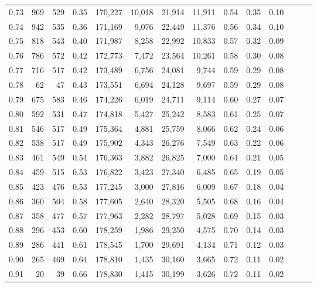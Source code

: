 \begin{tabular}{rrrrrrrrrrrrrr}
0.73 &    969 &  529 &  0.35 &  170,227 &   10,018 &  21,914 &  11,911 &  0.54 &  0.35 &      0.10 \\
0.74 &    942 &  535 &  0.36 &  171,169 &    9,076 &  22,449 &  11,376 &  0.56 &  0.34 &      0.10 \\
0.75 &    818 &  543 &  0.40 &  171,987 &    8,258 &  22,992 &  10,833 &  0.57 &  0.32 &      0.09 \\
0.76 &    786 &  572 &  0.42 &  172,773 &    7,472 &  23,564 &  10,261 &  0.58 &  0.30 &      0.08 \\
0.77 &    716 &  517 &  0.42 &  173,489 &    6,756 &  24,081 &   9,744 &  0.59 &  0.29 &      0.08 \\
0.78 &     62 &   47 &  0.43 &  173,551 &    6,694 &  24,128 &   9,697 &  0.59 &  0.29 &      0.08 \\
0.79 &    675 &  583 &  0.46 &  174,226 &    6,019 &  24,711 &   9,114 &  0.60 &  0.27 &      0.07 \\
0.80 &    592 &  531 &  0.47 &  174,818 &    5,427 &  25,242 &   8,583 &  0.61 &  0.25 &      0.07 \\
0.81 &    546 &  517 &  0.49 &  175,364 &    4,881 &  25,759 &   8,066 &  0.62 &  0.24 &      0.06 \\
0.82 &    538 &  517 &  0.49 &  175,902 &    4,343 &  26,276 &   7,549 &  0.63 &  0.22 &      0.06 \\
0.83 &    461 &  549 &  0.54 &  176,363 &    3,882 &  26,825 &   7,000 &  0.64 &  0.21 &      0.05 \\
0.84 &    459 &  515 &  0.53 &  176,822 &    3,423 &  27,340 &   6,485 &  0.65 &  0.19 &      0.05 \\
0.85 &    423 &  476 &  0.53 &  177,245 &    3,000 &  27,816 &   6,009 &  0.67 &  0.18 &      0.04 \\
0.86 &    360 &  504 &  0.58 &  177,605 &    2,640 &  28,320 &   5,505 &  0.68 &  0.16 &      0.04 \\
0.87 &    358 &  477 &  0.57 &  177,963 &    2,282 &  28,797 &   5,028 &  0.69 &  0.15 &      0.03 \\
0.88 &    296 &  453 &  0.60 &  178,259 &    1,986 &  29,250 &   4,575 &  0.70 &  0.14 &      0.03 \\
0.89 &    286 &  441 &  0.61 &  178,545 &    1,700 &  29,691 &   4,134 &  0.71 &  0.12 &      0.03 \\
0.90 &    265 &  469 &  0.64 &  178,810 &    1,435 &  30,160 &   3,665 &  0.72 &  0.11 &      0.02 \\
0.91 &     20 &   39 &  0.66 &  178,830 &    1,415 &  30,199 &   3,626 &  0.72 &  0.11 &      0.02 \\

\end{tabular}
